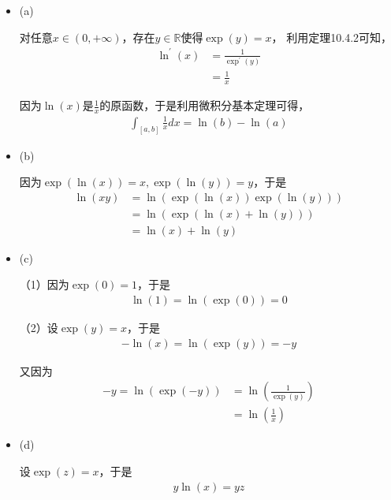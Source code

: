 \documentclass{article}
\begin{document}
\begin{itemize}
  \item (a)

        对任意$x \in (0, + \infty)$，存在$y \in \mathbb{R}$使得$\exp(y) = x$，
        利用定理10.4.2可知，
        \begin{align*}
          \ln^\prime(x) & = \frac{1}{\exp^\prime(y)} \\
                        & = \frac{1}{x}
        \end{align*}

        因为$\ln(x)$是$\frac{1}{x}$的原函数，于是利用微积分基本定理可得，
        \begin{align*}
          \int_{[a, b]}\frac{1}{x} dx = \ln(b) - \ln(a)
        \end{align*}

  \item (b)

        因为$\exp(\ln (x)) = x, \exp(\ln (y)) = y$，于是
        \begin{align*}
          \ln(xy) & = \ln(\exp(\ln (x))\exp(\ln (y))) \\
                  & = \ln(\exp(\ln (x) + \ln (y)))    \\
                  & = \ln(x) + \ln(y)
        \end{align*}

  \item (c)

        （1）因为$\exp(0) = 1$，于是
        \begin{align*}
          \ln(1) = \ln(\exp(0)) = 0
        \end{align*}

        （2）设$\exp(y) = x$，于是
        \begin{align*}
          -\ln(x) = \ln(\exp(y)) = -y
        \end{align*}

        又因为
        \begin{align*}
          -y = \ln(\exp(-y)) & = \ln(\frac{1}{\exp(y)}) \\
                             & = \ln(\frac{1}{x})
        \end{align*}

  \item (d)

        设$\exp(z) = x$，于是
        \begin{align*}
          y\ln(x) = yz
        \end{align*}


\end{itemize}
\end{document}
